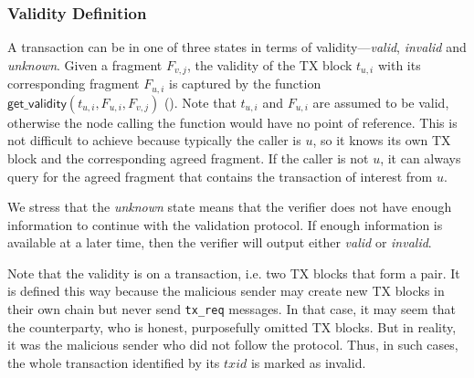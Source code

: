 \subsubsection{Validity Definition}
A transaction can be in one of three states in terms of validity---\emph{valid}, \emph{invalid} and \emph{unknown}.
Given a fragment $F_{v, j}$,
the validity of the TX block $t_{u, i}$ with its corresponding fragment $F_{u, i}$ is captured by the function $\textsf{get\_validity}(t_{u, i}, F_{u, i}, F_{v, j})$ ().
Note that $t_{u, i}$ and $F_{u, i}$ are assumed to be valid,
otherwise the node calling the function would have no point of reference.
This is not difficult to achieve because typically the caller is $u$,
so it knows its own TX block and the corresponding agreed fragment.
If the caller is not $u$, it can always query for the agreed fragment that contains the transaction of interest from $u$.


We stress that the \emph{unknown} state means that the verifier does not have enough information to continue with the validation protocol.
If enough information is available at a later time, then the verifier will output either \emph{valid} or \emph{invalid}.

Note that the validity is on a transaction, i.e. two TX blocks that form a pair.
It is defined this way because the malicious sender may create new TX blocks in their own chain but never send \texttt{tx\_req} messages.
In that case, it may seem that the counterparty, who is honest, purposefully omitted TX blocks.
But in reality, it was the malicious sender who did not follow the protocol.
Thus, in such cases, the whole transaction identified by its $txid$ is marked as invalid.

